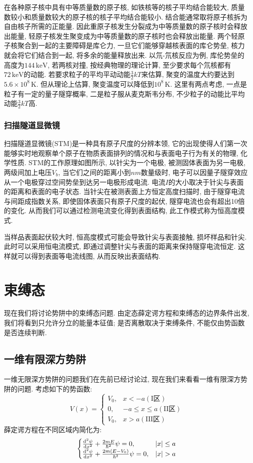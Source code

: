 在各种原子核中具有中等质量数的原子核, 如铁核等的核子平均结合能较大, 质量数较小和质量数较大的原子核的核子平均结合能较小. 结合能通常取将原子核拆为自由核子所需的正能量. 因此重原子核发生分裂成为中等质量数的原子核时会释放出能量, 轻原子核发生聚变成为中等质量数的原子核时也会释放出能量. 两个轻原子核聚合到一起的主要障碍是库仑力, 一旦它们能够穿越核表面的库仑势垒, 核力就会将它们结合到一起, 将多余的能量释放出来. 以氘-氘核反应为例, 库伦势垒的高度为$144\,\mathrm{keV}$, 若两核对撞, 按经典物理的理论计算, 至少要求每个氘核都有$72\,\mathrm{keV}$的动能. 若要求粒子的平均平动动能$\frac{3}{2}kT$来估算, 聚变的温度大约要达到$5.6 \times 10^8\,\mathrm{K}$. 但从理论上估算, 聚变温度可以降低到$10^{8}\,\mathrm{K}$. 这里有两点考虑, 一点是粒子有一定的量子隧穿概率, 二是粒子服从麦克斯韦分布, 不少粒子的动能比平均动能$\frac{3}{2}kT$高.

\subsubsection{扫描隧道显微镜}
扫描隧道显微镜(STM)是一种具有原子尺度的分辨本领, 它的出现使得人们第一次能够实时地观察单个原子在物质表面排列的情况和与表面电子行为有关的物理, 化学性质. STM的工作原理如图所示, 以针尖为一个电极, 被测固体表面为另一电极, 两级间加上电压$V_b$, 当它们之间的距离小到$nm$数量级时, 电子可以因量子隧穿效应从一个电极穿过空间势垒到达另一电极形成电流. 电流$I$的大小取决于针尖与表面的距离和表面的电子状态. 当针尖在被测表面上方恒定高度扫描时, 由于隧穿电流与间距成指数关系, 即使固体表面只有原子尺度的起伏, 隧穿电流也会有超出10倍的变化. 从而我们可以通过检测电流变化得到表面结构, 此工作模式称为恒高度模式.

当样品表面起伏较大时, 恒高度模式可能会导致针尖与表面接触, 损坏样品和针尖. 此时可以采用恒电流模式, 即通过调整针尖与表面的距离来保持隧穿电流恒定. 这样就可以得到表面等电流线图, 从而反映出表面结构.

\section{束缚态}
现在我们将讨论势阱中的束缚态问题. 由定态薛定谔方程和束缚态的边界条件出发, 我们将看到只允许分立的能量本征值; 是否离散取决于束缚条件, 不能仅由势函数是否连续判断.
\subsection{一维有限深方势阱}
一维无限深方势阱的问题我们在先前已经讨论过, 现在我们来看看一维有限深方势阱的问题. 考虑如下的势函数:
\[
V(x) = \begin{cases}
V_0, & x < -a (\text{I区})\\
0, & -a \leq x \leq a (\text{II区})\\
V_0, & x > a  (\text{III区})
\end{cases}
\]
薛定谔方程在不同区域内简化为:
\[
\begin{cases}
\frac{\d ^2 \psi}{\d x^2}+\frac{2mE}{\hbar^2}\psi = 0, & |x| \leq a \\
\frac{\d ^2 \psi}{\d x^2}+\frac{2m(E-V_0)}{\hbar^2}\psi = 0, & |x|>a
\end{cases}
\]

